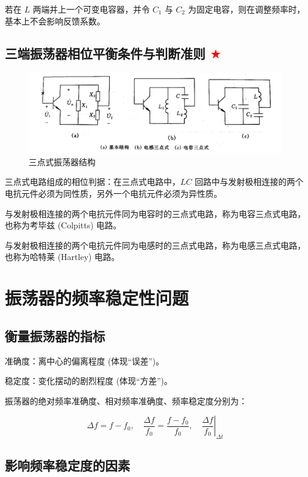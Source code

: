 若在 $L$ 两端并上一个可变电容器，并令 $C_1$ 与 $C_2$ 为固定电容，则在调整频率时，基本上不会影响反馈系数。

\subsection{三端振荡器相位平衡条件与判断准则 \textcolor{red}{$\bigstar$}}

\begin{figure}[htbp]
    \centering
    \includegraphics[scale=0.6]{image/Picture7.png}
    \caption{三点式振荡器结构}
\end{figure}

三点式电路组成的相位判据：在三点式电路中，$LC$ 回路中与发射极相连接的两个电抗元件必须为同性质，另外一个电抗元件必须为异性质。

与发射极相连接的两个电抗元件同为电容时的三点式电路，称为电容三点式电路，也称为考毕兹 (Colpitts) 电路。

与发射极相连接的两个电抗元件同为电感时的三点式电路，称为电感三点式电路，也称为哈特莱 (Hartley) 电路。

\section{振荡器的频率稳定性问题}

\subsection{衡量振荡器的指标}

准确度：离中心的偏离程度 (体现“误差”)。

稳定度：变化摆动的剧烈程度 (体现“方差”)。

振荡器的绝对频率准确度、相对频率准确度、频率稳定度分别为：

\begin{equation}
    \Delta f = f - f_0, \quad \frac{\Delta f}{f_0} = \frac{f - f_0}{f_0}, \quad \left. \frac{\Delta f}{f_0} \right|_{\Delta t}
\end{equation}

\subsection{影响频率稳定度的因素}


